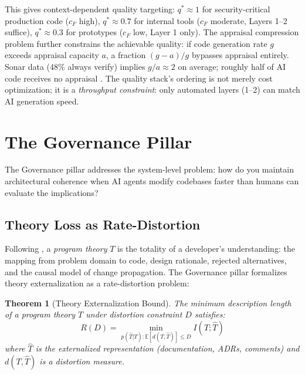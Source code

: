 \documentclass[11pt, a4paper, logo, copyright]{googledeepmind}
\newtheorem{theorem}{Theorem}[section]
\begin{document}
This gives context-dependent quality targeting: $q^* \approx 1$ for security-critical production code ($c_F$ high), $q^* \approx 0.7$ for internal tools ($c_F$ moderate, Layers 1--2 suffice), $q^* \approx 0.3$ for prototypes ($c_F$ low, Layer 1 only). The appraisal compression problem further constrains the achievable quality: if code generation rate $g$ exceeds appraisal capacity $a$, a fraction $(g-a)/g$ bypasses appraisal entirely. Sonar data (48\% always verify) implies $g/a \approx 2$ on average; roughly half of AI code receives no appraisal \citep{sonar2026}. The quality stack's ordering is not merely cost optimization; it is a \emph{throughput constraint}: only automated layers (1--2) can match AI generation speed.


\section{The Governance Pillar}
\label{sec:governance}

The Governance pillar addresses the system-level problem: how do you maintain architectural coherence when AI agents modify codebases faster than humans can evaluate the implications?

\subsection{Theory Loss as Rate-Distortion}

Following \citet{naur1985}, a \emph{program theory} $T$ is the totality of a developer's understanding: the mapping from problem domain to code, design rationale, rejected alternatives, and the causal model of change propagation. The Governance pillar formalizes theory externalization as a rate-distortion problem:

\begin{theorem}[Theory Externalization Bound]
\label{thm:theory-loss}
The minimum description length of a program theory $T$ under distortion constraint $D$ satisfies:
\begin{equation}
    R(D) = \min_{p(\hat{T}|T): \mathbb{E}[d(T,\hat{T})] \leq D} I(T; \hat{T})
\end{equation}
where $\hat{T}$ is the externalized representation (documentation, ADRs, comments) and $d(T, \hat{T})$ is a distortion measure.
\end{theorem}
\end{document}
